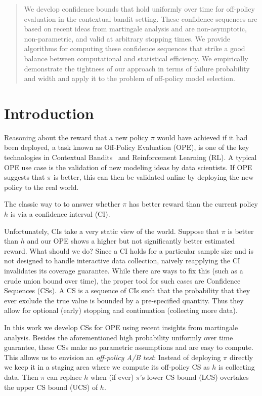 \begin{abstract}
We develop confidence bounds that hold uniformly over time 
for off-policy evaluation in the contextual bandit
setting. These confidence sequences are based 
on recent ideas from martingale analysis and
are non-asymptotic, non-parametric, and valid 
at arbitrary stopping times. 
We provide algorithms for computing these 
confidence sequences that strike a 
good balance between computational and
statistical efficiency.
We empirically demonstrate the tightness
of our approach
in terms of failure probability and 
width and apply it to the problem of
off-policy model selection.
\end{abstract}

\section{Introduction}
Reasoning about the reward that 
a new policy $\pi$ would have achieved if it had been
deployed, a task known as Off-Policy Evaluation (OPE),
is one of the key technologies in Contextual
Bandits~\cite{epochgreedy} and Reinforcement Learning (RL).
A typical OPE use case is the validation of new modeling ideas
by data scientists. If OPE suggests that 
$\pi$ is better, this can then be validated 
online by deploying the new policy to the real world.

The classic way to to answer whether $\pi$ has better 
reward than the current policy $h$ is via a
confidence interval (CI).

Unfortunately, CIs take a very static view of the world.
Suppose that $\pi$ is better than $h$ 
and our OPE shows a higher but not significantly better 
estimated reward. What should we do? Since a CI holds for a
particular sample size and is not designed to handle 
interactive data collection, naively reapplying the CI
invalidates its coverage guarantee. While there are ways
to fix this (such as a crude union bound over time), 
the proper tool for such cases
are Confidence Sequences (CSs). A CS is a sequence 
of CIs such that the probability that they ever exclude 
the true value is bounded by a pre-specified quantity. 
Thus they allow for
optional (early) stopping and continuation 
(collecting more data).

In this work we develop CSs for OPE using 
recent insights from martingale analysis. 
Besides the aforementioned high probability
uniformly over time guarantee, these CSs make no parametric 
assumptions and are easy to compute. This
allows us to envision an \emph{off-policy A/B test}:
Instead of deploying $\pi$ directly 
we keep it in a staging area where 
we compute its off-policy CS as $h$ is collecting data.
Then $\pi$ can replace $h$ when (if ever)
$\pi$'s lower CS bound (LCS) 
overtakes the upper CS bound (UCS) of $h$.

